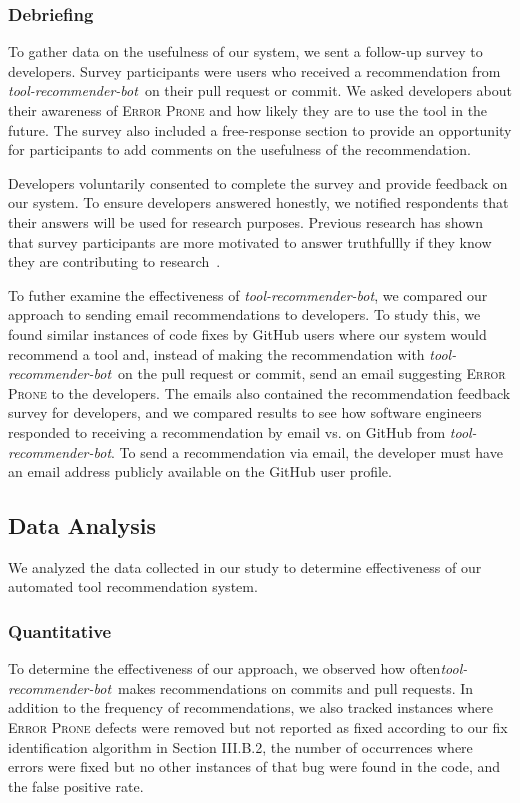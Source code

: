 \documentclass[sigconf,review,anonymous]{acmart}
\newcommand{\tool}{\textsl{tool-recommender-bot}}
\begin{document}
\subsubsection{Debriefing}

To gather data on the usefulness of our system, we sent a follow-up survey to developers. Survey participants were users who received a recommendation from \tool~on their pull request or commit. We asked developers about their awareness of \textsc{Error Prone} and how likely they are to use the tool in the future. The survey also included a free-response section to provide an opportunity for participants to add comments on the usefulness of the recommendation.

Developers voluntarily consented to complete the survey and provide feedback on our system. To ensure developers answered honestly, we notified respondents that their answers will be used for research purposes. Previous research has shown that survey participants are more motivated to answer truthfullly if they know they are contributing to research~\cite{Krosnick1991Research}. 

To futher examine the effectiveness of \tool, we compared our approach to sending email recommendations to developers. To study this, we found similar instances of code fixes by GitHub users where our system would recommend a tool and, instead of making the recommendation with \tool~on the pull request or commit, send an email suggesting \textsc{Error Prone} to the developers. The emails also contained the recommendation feedback survey for developers, and we compared results to see how software engineers responded to receiving a recommendation by email vs. on GitHub from \tool. To send a recommendation via email, the developer must have an email address publicly available on the GitHub user profile. 

\subsection{Data Analysis}

We analyzed the data collected in our study to determine effectiveness of our automated tool recommendation system.

\subsubsection{Quantitative}

To determine the effectiveness of our approach, we observed how often\tool~makes recommendations on commits and pull requests. In addition to the frequency of recommendations, we also tracked instances where \textsc{Error Prone} defects were removed but not reported as fixed according to our fix identification algorithm in Section III.B.2, the number of occurrences where errors were fixed but no other instances of that bug were found in the code, and the false positive rate.
\end{document}
